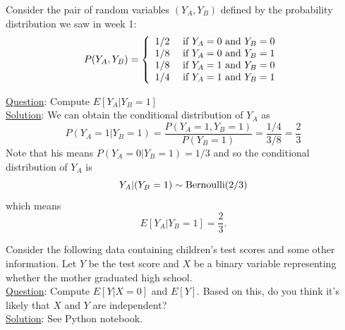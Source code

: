 \begin{example}
Consider the pair of random variables $(Y_A,Y_B)$ defined by the probability distribution we saw in week 1:
\begin{equation}\label{eq:gene}
P(Y_A,Y_B) = \left\{ \begin{array}{cc}
1/2 & \text{ if }Y_A=0 \text{ and } Y_B = 0\\
1/8 & \text{ if }Y_A=0 \text{ and } Y_B = 1\\
1/8 & \text{ if }Y_A=1 \text{ and } Y_B = 0\\
1/4 & \text{ if }Y_A=1 \text{ and } Y_B = 1\\
\end{array}
 \right.\\
\end{equation}


\noindent
\underline{Question}: Compute $E[Y_A|Y_B=1]$\\

\noindent
\underline{Solution}: We can obtain the conditional distribution of $Y_A$ as 
\begin{equation*}
P(Y_A=1|Y_B = 1) = \frac{P(Y_A=1,Y_B=1)}{P(Y_B=1)} = \frac{1/4}{3/8} = \frac{2}{3}
\end{equation*}
Note that his means $P(Y_A=0|Y_B = 1) = 1/3$ and so the conditional distribution of  $Y_A$ is 
\begin{equation*}
Y_A|(Y_B=1) \sim {\rm Bernoulli}(2/3)
\end{equation*}
which means 
\begin{equation*}
E[Y_A|Y_B=1] = \frac{2}{3}.
\end{equation*}

\end{example}

\begin{example}
Consider the following data containing children's test scores and some other information. Let $Y$ be the test score and $X$ be a binary variable representing whether the mother graduated high school.\\


\noindent
\underline{Question}: Compute $E[Y|X=0]$ and $E[Y]$. Based on this, do you think it's likely that $X$ and $Y$ are independent? \\

\noindent
\underline{Solution}: See Python notebook.



\end{example}




